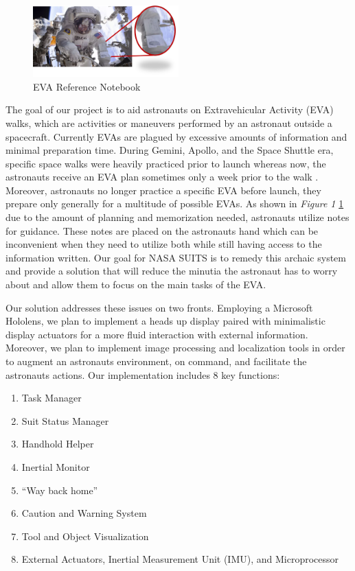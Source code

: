 \documentclass{article}
\begin{document}
\begin{figure}[!htb]
  \centering
  \includegraphics[width=0.5\textwidth]{assets/spacesuitdisplay.png}
  \caption{EVA Reference Notebook}
  \label{fig:spacesuitdisplay}
\end{figure}

The goal of our project is to aid astronauts on Extravehicular Activity (EVA) walks, which are activities or maneuvers performed by an astronaut outside a spacecraft. Currently EVAs are plagued by excessive amounts of information and minimal preparation time. During Gemini, Apollo, and the Space Shuttle era, specific space walks were heavily practiced prior to launch whereas now, the astronauts receive an EVA plan sometimes only a week prior to the walk \autocite{mannedspaceflight}. Moreover, astronauts no longer practice a specific EVA before launch, they prepare only generally for a multitude of possible EVAs. As shown in \textit{Figure 1} \ref{fig:spacesuitdisplay} due to the amount of planning and memorization needed, astronauts utilize notes for guidance. These notes are placed on the astronauts hand which can be inconvenient when they need to utilize both while still having access to the information written. Our goal for NASA SUITS is to remedy this archaic system and provide a solution that will reduce the minutia the astronaut has to worry about and allow them to focus on the main tasks of the EVA.

Our solution addresses these issues on two fronts. Employing a Microsoft Hololens, we plan to implement a heads up display paired with minimalistic display actuators for a more fluid interaction with external information. Moreover, we plan to implement image processing and localization tools in order to augment an astronauts environment, on command, and facilitate the astronauts actions. Our implementation includes 8 key functions:

\begin{enumerate}
\item Task Manager
\item Suit Status Manager
\item Handhold Helper
\item Inertial Monitor
\item “Way back home”
\item Caution and Warning System
\item Tool and Object Visualization
\item External Actuators, Inertial Measurement Unit (IMU), and Microprocessor
\end{enumerate}
\end{document}
